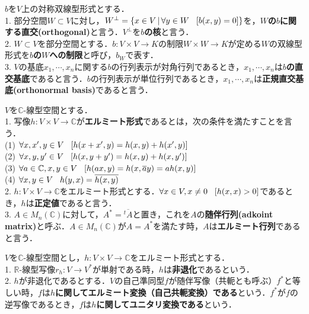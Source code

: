 \documentclass[uplatex, dvipdfmx]{jsreport}
\begin{document}
\begin{definition}$b$を$V$上の対称双線型形式とする．\rm{}\\
    1. 部分空間$W\subset V$に対し，$W^\perp = \{ x\in V\,|\, \forall y\in W \hspace{3mm}[b(x,y)=0] \}$を，\textbf{$W$の$b$に関する直交(orthogonal)}と言う．$V^\perp$を\textbf{$b$の核}と言う．\\
    2. $W\subset V$を部分空間とする．$b:V\times V\longrightarrow K$の制限$W\times W\longrightarrow K$が定める$W$の双線型形式を\textbf{$b$の$W$への制限}と呼び，$b_W$で表す．\\
    3. $V$の基底$x_1,\cdots,x_n$に関する$b$の行列表示が対角行列であるとき，$x_1,\cdots,x_n$は\textbf{$b$の直交基底}であると言う．$b$の行列表示が単位行列であるとき，$x_1,\cdots,x_n$は\textbf{正規直交基底(orthonormal basis)}であると言う．
\end{definition}

\begin{definition}$V$を$\mathbb{C}$-線型空間とする．\rm{}\\
    1. 写像$h:V\times V\longrightarrow\mathbb{C}$が\textbf{エルミート形式}であるとは，次の条件を満たすことを言う．\\
    \hspace{3mm}(1) $\forall x,x',y\in V \hspace{3mm} [h(x+x',y)=h(x,y)+h(x',y)]$\\
    \hspace{3mm}(2) $\forall x,y,y'\in V \hspace{3mm} [h(x,y+y')=h(x,y)+h(x,y')]$\\
    \hspace{3mm}(3) $\forall a\in\mathbb{C}, x,y\in V \hspace{3mm} [h(ax,y)=h(x,\overline{a}y)=ah(x,y)]$\\
    \hspace{3mm}(4) $\forall x,y\in V \hspace{3mm} h(y,x)=\overline{h(x,y)}$\\
    2. $h:V\times V\longrightarrow\mathbb{C}$をエルミート形式とする．$\forall x\in V, x\ne 0 \hspace{3mm}[h(x,x)>0]$であるとき，$h$は\textbf{正定値}であると言う．\\
    3. $A\in M_n(\mathbb{C})$に対して，$A^*=\overline{{}^t\!A}$と置き，これを$A$の\textbf{随伴行列(adkoint matrix)}と呼ぶ．$A\in M_n(\mathbb{C})$が$A=A^*$を満たす時，$A$は\textbf{エルミート行列}であると言う．
\end{definition}
\begin{definition}$V$を$\mathbb{C}$-線型空間とし，$h:V\times V\longrightarrow\mathbb{C}$をエルミート形式とする．\rm{}\\
    1. $\mathbb{R}$-線型写像$r_h:V\longrightarrow V^*$が単射である時，$h$は\textbf{非退化}であるという．\\
    2. $h$が非退化であるとする．$V$の自己準同型$f$が随伴写像（共軛とも呼ぶ）$f^*$と等しい時，$f$は\textbf{$h$に関してエルミート変換（自己共軛変換）である}という．$f^*$が$f$の逆写像であるとき，$f$は\textbf{$h$に関してユニタリ変換である}という．
\end{definition}
\end{document}
